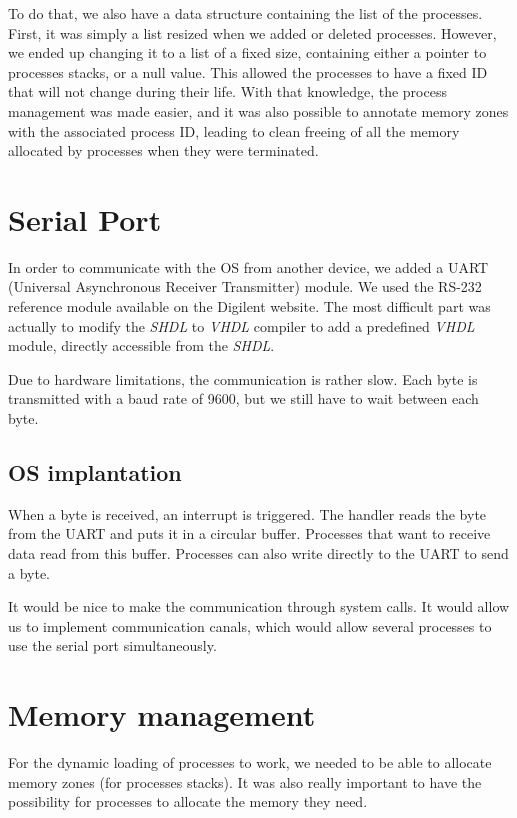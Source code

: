 \documentclass[openany, a4paper]{book}
\begin{document}
      To do that, we also have a data structure containing the list of the
      processes. First, it was simply a list resized when we added or deleted
      processes. However, we ended up changing it to a list of a fixed size,
      containing either a pointer to processes stacks, or a null value.
      This allowed the processes to have a fixed ID that will not change during
      their life. With that knowledge, the process management was made
      easier, and it was also possible to annotate memory zones with the
      associated process ID, leading to clean freeing of all the memory
      allocated by processes when they were terminated.

    \section{Serial Port}
      In order to communicate with the OS from another device, we added a UART
      (Universal Asynchronous Receiver Transmitter) module. We used the RS-232
      reference module available on the Digilent website. The most difficult
      part was actually to modify the \emph{SHDL} to \emph{VHDL} compiler to add
      a predefined \emph{VHDL} module, directly accessible from the \emph{SHDL}.

      Due to hardware limitations, the communication is rather slow. Each byte
      is transmitted with a baud rate of 9600, but we still have to wait
      between each byte.

      \subsection{OS implantation}
        When a byte is received, an interrupt is triggered. The handler
        reads the byte from the UART and puts it in a circular buffer.
        Processes that want to receive data read from this buffer. Processes can
        also write directly to the UART to send a byte.

        It would be nice to make the communication through system calls. It
        would allow us to implement communication canals, which would allow
        several processes to use the serial port simultaneously.

    \section{Memory management}
      For the dynamic loading of processes to work, we needed to be able to
      allocate memory zones (for processes stacks). It was also really important
      to have the possibility for processes to allocate the memory they need.
\end{document}
